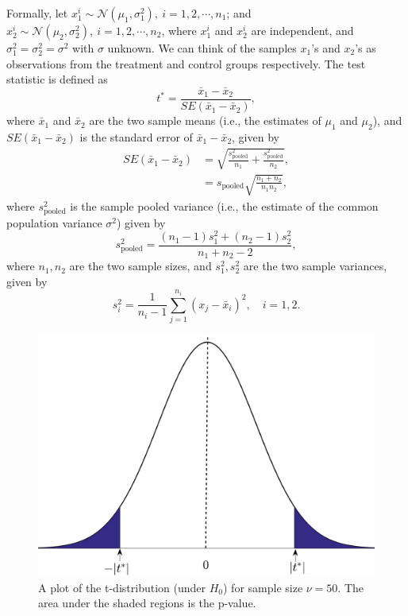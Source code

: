 \documentclass[10pt, aps,twocolumn, superscriptaddress, nofootinbib]{revtex4-2}
\begin{document}
Formally, let $x_1^i \sim \mathcal{N}(\mu_1, \sigma_1^2),~i = 1,2,\cdots, n_1$; and  $x_2^i \sim \mathcal{N}(\mu_2, \sigma_2^2), ~i = 1,2,\cdots, n_2$, where $x_1^i$ and $x_2^i$ are independent, and  $\sigma_1^2 = \sigma_2^2 = \sigma^2$ with $\sigma$ unknown.  We can think of the samples $x_1$'s and $x_2$'s as observations from the treatment and control groups respectively.  The test statistic is defined as
  \begin{equation}
 	t^* =\frac{\bar{x}_1 -\bar{x}_2}{SE({\bar{x}_1 -\bar{x}_2})},
 	\label{eqn8}
 \end{equation}
 where  $\bar{x}_1$ and $\bar{x}_2$ are the two sample means (i.e., the estimates of $\mu_1$ and $\mu_2$), and $SE({\bar{x}_1 -\bar{x}_2})$ is the  standard error of $\bar{x}_1 -\bar{x}_2$, given by
  \begin{align}
 	SE({\bar{x}_1 -\bar{x}_2}) &= \sqrt{\frac{s_{\text{pooled}}^2}{n_1} + \frac{s_{\text{pooled}}^2}{n_2}},\nonumber\\&
 	=s_{\text{pooled}}\sqrt{\frac{n_1+n_2}{n_1n_2}},
 	\label{eqn9}
 \end{align} 
 where $s_{\text{pooled}}^2$ is the sample pooled variance (i.e., the estimate of the common population variance $\sigma^2$) given by
 \begin{equation}
 	s_{\text{pooled}}^2 = \frac{(n_1-1)s_1^2 + (n_2-1)s_2^2}{n_1+n_2-2},
 	\label{pool}
 \end{equation} 
 where $n_1, n_2$ are the two sample sizes, and $s_1^2, s_2^2$ are the two sample variances, given by
 \begin{equation}
 	s_i^2 = \frac{1}{n_i-1}\sum_{j=1}^{n_i}(x_j - \bar{x}_i)^2,\quad i = 1, 2.
 	\label{vars}
 \end{equation}
  
 \begin{figure}[ht]
    \centering
    \includegraphics[scale=.2]{t_dist.png}
    \caption{A plot of the t-distribution (under $H_0$) for sample size $\nu = 50$. The area under the shaded regions is the p-value. }
    \label{fig2}
\end{figure}
\end{document}
